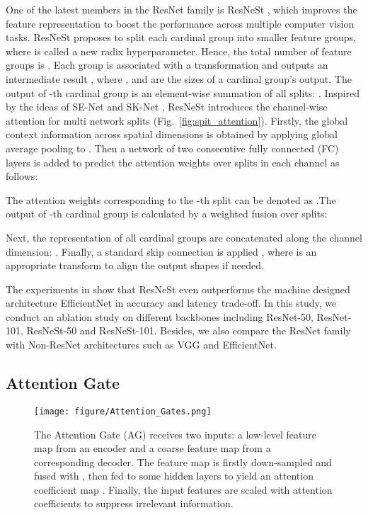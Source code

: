 \documentclass[review, sort&compress]{elsarticle}
\begin{document}
	One of the latest members in the ResNet family is ResNeSt \cite{zhang2020resnest}, which improves the feature representation to boost the performance across multiple computer vision tasks. ResNeSt proposes to split each cardinal group into  smaller feature groups, where  is called a new radix hyperparameter. Hence, the total number of feature groups is . Each group is associated with a transformation  and outputs an intermediate result , where , and  are the sizes of a cardinal group's output. The output of -th cardinal group is an element-wise summation of all  splits: . Inspired by the ideas of SE-Net \cite{hu2018squeeze} and SK-Net \cite{li2019selective}, ResNeSt introduces the channel-wise attention for multi network splits (Fig.~\ref{fig:spit_attention}). Firstly, the global context information across spatial dimensions  is obtained by applying global average pooling to . Then a network  of two consecutive fully connected (FC) layers is added to predict the attention weights over splits in each channel  as follows:
	
	
	The attention weights corresponding to the -th split can be denoted as .The output of -th cardinal group  is calculated by a weighted fusion over splits:
	
	
	
	Next, the representation of all cardinal groups are concatenated along the channel dimension: . Finally, a standard skip connection is applied , where  is an appropriate transform to align the output shapes if needed.
	
	The experiments in \cite{zhang2020resnest} show that ResNeSt even outperforms the machine designed architecture EfficientNet \cite{tan2019efficientnet} in accuracy and latency trade-off. In this study, we conduct an ablation study on different backbones including ResNet-50, ResNet-101, ResNeSt-50 and ResNeSt-101. Besides, we also compare the ResNet family with Non-ResNet architectures such as VGG and EfficientNet.
	
	\subsection{Attention Gate}
	\begin{figure*}[ht!]
		\texttt{[image: figure/Attention\_Gates.png]}
		\caption{The Attention Gate (AG) receives two inputs: a low-level feature map  from an encoder and a coarse feature map  from a corresponding decoder. The feature map  is firstly down-sampled and fused with , then fed to some hidden layers to yield an attention coefficient map . Finally, the input features  are scaled with attention coefficients to suppress irrelevant information.}
		\label{fig:attention_gate}
	\end{figure*}
	
\end{document}
